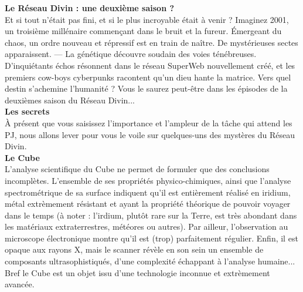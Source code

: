 \documentclass[11pt,twoside,a4paper]{book}
\begin{document}
\textbf{\large Le R{\'e}seau Divin : une deuxi{\`e}me saison ?} ~\\

Et si tout n'{\'e}tait pas fini, et si le plus incroyable {\'e}tait {\`a} venir ? Imaginez 2001, un troisi{\`e}me mill{\'e}naire commen\c{c}ant dans le bruit et la fureur. {\'E}mergeant du chaos, un ordre nouveau et r{\'e}pressif est en train de na{\^i}tre. De myst{\'e}rieuses sectes apparaissent. --- La g{\'e}n{\'e}tique d{\'e}couvre soudain des voies t{\'e}n{\'e}breuses. D'inqui{\'e}tants {\'e}chos r{\'e}sonnent dans le r{\'e}seau SuperWeb nouvellement cr{\'e}{\'e}, et les premiers cow-boys cyberpunks racontent qu'un dieu hante la matrice. Vers quel destin s'achemine l'humanit{\'e} ? Vous le saurez peut-{\^e}tre dans les {\'e}pisodes de la deuxi{\`e}mes saison du R{\'e}seau Divin... ~\\


\textbf{\Large Les secrets} ~\\

{\`A} pr{\'e}sent que vous saisissez l'importance et l'ampleur de la t{\^a}che qui attend les PJ, nous allons lever pour vous le voile sur quelques-uns des myst{\`e}res du R{\'e}seau Divin. ~\\

\textbf{\large Le Cube} ~\\

L'analyse scientifique du Cube ne permet de formuler que des conclusions incompl{\`e}tes. L'ensemble de ses propri{\'e}t{\'e}s physico-chimiques, ainsi que l'analyse spectrom{\'e}trique de sa surface indiquent qu'il est enti{\`e}rement r{\'e}alis{\'e} en iridium, m{\'e}tal extr{\`e}mement r{\'e}sistant et ayant la propri{\'e}t{\'e} th{\'e}orique de pouvoir voyager dans le temps ({\`a} noter : l'irdium, plut{\^o}t rare sur la Terre, est tr{\`e}s abondant dans les mat{\'e}riaux extraterrestres, m{\'e}t{\'e}ores ou autres). Par ailleur, l'observation au microscope {\'e}lectronique montre qu'il est (trop) parfaitement r{\'e}gulier. Enfin, il est opaque aux rayons X, mais le scanner r{\'e}v{\`e}le en son sein un ensemble de composants ultrasophistiqu{\'e}s, d'une complexit{\'e} {\'e}chappant {\`a} l'analyse humaine... Bref le Cube est un objet issu d'une technologie inconnue et extr{\`e}mement avanc{\'e}e. ~\\
\end{document}
